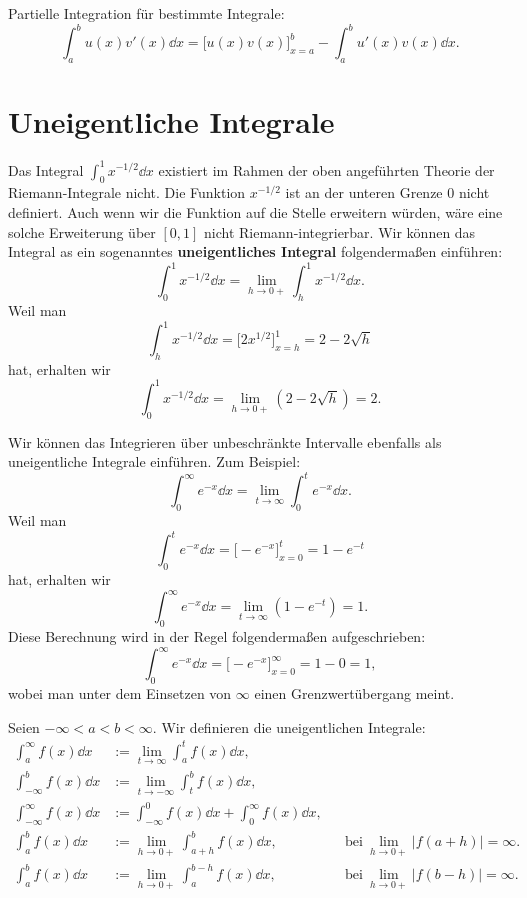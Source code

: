 \begin{bem}
	Partielle Integration für bestimmte Integrale: 
	\[
		\int_a^b u(x) v'(x) \dd x = \biggl[ u(x) v(x) \biggr]_{x=a}^b - \int_a^b u'(x) v(x) \dd x. 
	\]
\end{bem} 

\section{Uneigentliche Integrale} 

\begin{bsp} 
	Das Integral 
	 $\int_0^1 x^{-1/2} \dd x$ existiert im Rahmen der oben angeführten Theorie der Riemann-Integrale nicht. Die Funktion $x^{-1/2}$ ist an der unteren Grenze $0$ nicht definiert. Auch wenn wir die Funktion auf die Stelle erweitern würden, wäre eine solche Erweiterung über $[0,1]$ nicht Riemann-integrierbar. Wir können das Integral as ein sogenanntes \textbf{uneigentliches Integral} folgendermaßen einführen: 
	 \[
	 	\int_0^1 x^{-1/2} \dd x = \lim_{h \to 0 + } \int_h^1 x^{-1/2} \dd x.
	 \]
	 Weil man 
	 \[
	 		\int_h^1 x^{-1/2} \dd x = \biggl[ 2 x^{1/2} \biggr]_{x=h}^1 = 2 - 2 \sqrt{h} 
	 \]
	 hat, erhalten wir 
	 \[
	 	\int_0^1 x^{-1/2} \dd x = \lim_{h \to 0+} ( 2  - 2\sqrt{h} ) = 2.
	 \] 
\end{bsp} 

\begin{bsp}
	Wir können das Integrieren über unbeschränkte Intervalle ebenfalls als uneigentliche Integrale einführen. Zum Beispiel:
	\[
		\int_0^\infty e^{-x} \dd x = \lim_{t \to \infty} \int_0^t e^{-x} \dd x. 
	\]
	Weil man 
	\[
		\int_0^t e^{-x} \dd x = \biggl[ - e^{-x} \biggr]_{x=0}^t = 1 - e^{-t}
	\]
	hat, erhalten wir 
	\[
		\int_0^\infty e^{-x} \dd x = \lim_{t \to \infty} (1 - e^{-t}) = 1. 
	\]
	Diese Berechnung wird in der Regel folgendermaßen aufgeschrieben: 
	\[
		\int_0^\infty e^{-x} \dd x = \biggl[ -e^{-x} \biggr]_{x=0}^\infty  = 1 - 0 = 1, 
	\]
	wobei man unter dem Einsetzen von $\infty$ einen Grenzwertübergang meint. 
\end{bsp} 

\begin{defn} 
	Seien $-\infty < a< b < \infty$. Wir definieren die uneigentlichen Integrale:
	\begin{align*}
		\int_a^\infty f(x) \dd x & := \lim_{t \to \infty} \int_a^t f(x) \dd x,
		\\ \int_{-\infty}^b f(x) \dd x & := \lim_{t \to -\infty} \int_t^b f(x) \dd x,
		\\ \int_{-\infty}^\infty f(x) \dd x & := \int_{-\infty}^0 f(x) \dd x + \int_0^\infty f(x) \dd x,
		\\ \int_a^b f(x) \dd x & := \lim_{h \to 0+} \int_{a+h}^b f(x) \dd x,  & & \text{bei} \ \lim_{h \to 0+} |f(a+h)| =\infty.
		\\ \int_a^b f(x) \dd x & := \lim_{h \to 0+} \int_a^{b-h} f(x) \dd x, & & \text{bei} \ \lim_{h \to 0+} |f(b-h)| = \infty. 
	\end{align*} 
\end{defn} 

